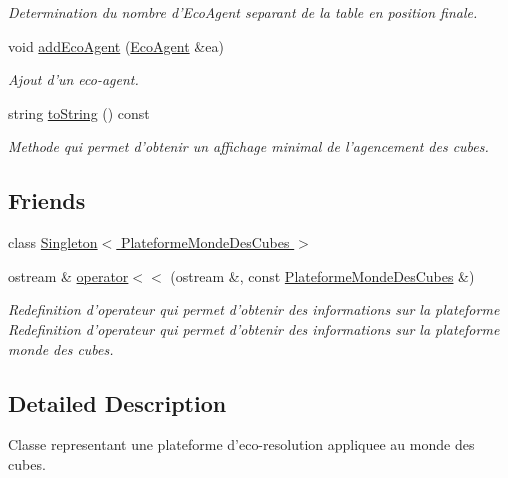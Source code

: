 \begin{CompactItemize}
\begin{CompactList}\small\item\em Determination du nombre d'EcoAgent separant de la table en position finale. \item\end{CompactList}\item 
void \hyperlink{classPlateformeMondeDesCubes_6fb5b9ececb0e7893b2c7ff5531cb3b1}{addEcoAgent} (\hyperlink{classEcoAgent}{EcoAgent} \&ea)
\begin{CompactList}\small\item\em Ajout d'un eco-agent. \item\end{CompactList}\item 
string \hyperlink{classPlateformeMondeDesCubes_a834747e527529fd8c4bfc61bee6c20f}{toString} () const 
\begin{CompactList}\small\item\em Methode qui permet d'obtenir un affichage minimal de l'agencement des cubes. \item\end{CompactList}\end{CompactItemize}
\subsection*{Friends}
\begin{CompactItemize}
\item 
\hypertarget{classPlateformeMondeDesCubes_95609583990e9782a41cc432bdd2578d}{
class \hyperlink{classPlateformeMondeDesCubes_95609583990e9782a41cc432bdd2578d}{Singleton$<$ PlateformeMondeDesCubes $>$}}
\label{classPlateformeMondeDesCubes_95609583990e9782a41cc432bdd2578d}

\item 
ostream \& \hyperlink{classPlateformeMondeDesCubes_98d6997efa9a51e23997364f1f09c7bd}{operator$<$$<$} (ostream \&, const \hyperlink{classPlateformeMondeDesCubes}{PlateformeMondeDesCubes} \&)
\begin{CompactList}\small\item\em Redefinition d'operateur qui permet d'obtenir des informations sur la plateforme Redefinition d'operateur qui permet d'obtenir des informations sur la plateforme monde des cubes. \item\end{CompactList}\end{CompactItemize}


\subsection{Detailed Description}
Classe representant une plateforme d'eco-resolution appliquee au monde des cubes. 

